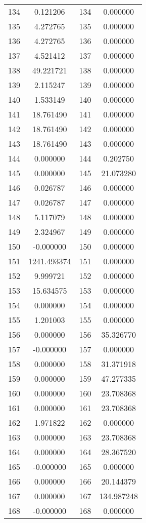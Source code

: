 \documentclass[12pt]{article}
\begin{document}
\begin{longtable}{@{}cccc@{}}
134 & 0.121206 & 134 & 0.000000 \\
135 & 4.272765 & 135 & 0.000000 \\
136 & 4.272765 & 136 & 0.000000 \\
137 & 4.521412 & 137 & 0.000000 \\
138 & 49.221721 & 138 & 0.000000 \\
139 & 2.115247 & 139 & 0.000000 \\
140 & 1.533149 & 140 & 0.000000 \\
141 & 18.761490 & 141 & 0.000000 \\
142 & 18.761490 & 142 & 0.000000 \\
143 & 18.761490 & 143 & 0.000000 \\
144 & 0.000000 & 144 & 0.202750 \\
145 & 0.000000 & 145 & 21.073280 \\
146 & 0.026787 & 146 & 0.000000 \\
147 & 0.026787 & 147 & 0.000000 \\
148 & 5.117079 & 148 & 0.000000 \\
149 & 2.324967 & 149 & 0.000000 \\
150 & -0.000000 & 150 & 0.000000 \\
151 & 1241.493374 & 151 & 0.000000 \\
152 & 9.999721 & 152 & 0.000000 \\
153 & 15.634575 & 153 & 0.000000 \\
154 & 0.000000 & 154 & 0.000000 \\
155 & 1.201003 & 155 & 0.000000 \\
156 & 0.000000 & 156 & 35.326770 \\
157 & -0.000000 & 157 & 0.000000 \\
158 & 0.000000 & 158 & 31.371918 \\
159 & 0.000000 & 159 & 47.277335 \\
160 & 0.000000 & 160 & 23.708368 \\
161 & 0.000000 & 161 & 23.708368 \\
162 & 1.971822 & 162 & 0.000000 \\
163 & 0.000000 & 163 & 23.708368 \\
164 & 0.000000 & 164 & 28.367520 \\
165 & -0.000000 & 165 & 0.000000 \\
166 & 0.000000 & 166 & 20.144379 \\
167 & 0.000000 & 167 & 134.987248 \\
168 & -0.000000 & 168 & 0.000000 \\

\end{longtable}
\end{document}
